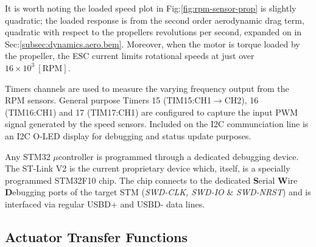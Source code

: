 \par
It is worth noting the loaded speed plot in Fig:\ref{fig:rpm-sensor-prop} is slightly quadratic; the loaded response is from the second order aerodynamic drag term, quadratic with respect to the propellers revolutions per second, expanded on in Sec:\ref{subsec:dynamics.aero.bem}. Moreover, when the motor is torque loaded by the propeller, the ESC current limits rotational speeds at just over $16\times 10^3~[\text{RPM}]$.
\par
Timers channels are used to measure the varying frequency output from the RPM sensors. General purpose Timers 15 (TIM15:CH1$\rightarrow$CH2), 16 (TIM16:CH1) and 17 (TIM17:CH1) are configured to capture the input PWM signal generated by the speed sensors. Included on the I2C communciation line is an I2C O-LED display for debugging and status update purposes.
\par
Any STM32 $\mu$controller is programmed through a dedicated debugging device. The ST-Link V2\cite{st-link} is the current proprietary device which, itself, is a specially programmed STM32F10 chip. The chip connects to the dedicated \textbf{S}erial \textbf{W}ire \textbf{D}ebugging ports of the target STM (\emph{SWD-CLK, SWD-IO} \& \emph{SWD-NRST}) and is interfaced via regular USBD+ and USBD- data lines. 
\subsection{Actuator Transfer Functions}
\label{subsec:proto.design.transfer}
